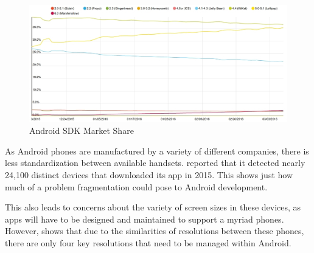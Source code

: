 \begin{figure}[ht]
	\centering
	\includegraphics[scale=0.4]{images/AndroidSDKMarketShare.jpg}
	\caption{Android SDK Market Share \citep{appbrainsdkversions}}
	\label{fig:AndroidVersions}
\end{figure}

As Android phones are manufactured by a variety of different companies, there is less standardization between available handsets. 
\cite{uniqueandroiddevices} reported that it detected nearly 24,100 distinct devices that downloaded its app in 2015.
This shows just how much of a problem fragmentation could pose to Android development.

This also leads to concerns about the variety of screen sizes in these devices, as apps will have to be designed and maintained to support a myriad phones. 
However, \cite{androidscreenfragmentation} shows that due to the similarities of resolutions between these phones, there are only four key resolutions that need to be managed within Android. %

